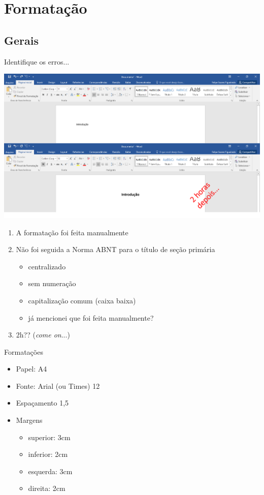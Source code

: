 \documentclass{beamer}
\begin{document}
\section{Formatação}

\subsection{Gerais}

\begin{frame}{Identifique os erros...}
  \begin{center}
    \includegraphics[width=1.2\textwidth]{ProjetoII/intro}
  \end{center}
\end{frame}

\begin{frame}
  \begin{enumerate}
  \item A formatação foi feita manualmente
  \item Não foi seguida a Norma ABNT para o título de seção primária
    \begin{itemize}
    \item centralizado
    \item sem numeração
    \item capitalização comum (caixa baixa)
    \item já mencionei que foi feita manualmente?
    \end{itemize}
  \item 2h?? ({\em come on}...)
  \end{enumerate}
\end{frame}

\begin{frame}{Formatações}
  \begin{itemize}
  \item Papel: A4
  \item Fonte: Arial (ou Times) 12
  \item Espaçamento 1,5
  \item Margens
    \begin{itemize}
    \item superior: 3cm
    \item inferior: 2cm
    \item esquerda: 3cm
    \item direita: 2cm
    \end{itemize}
  \end{itemize}
\end{frame}
\end{document}
